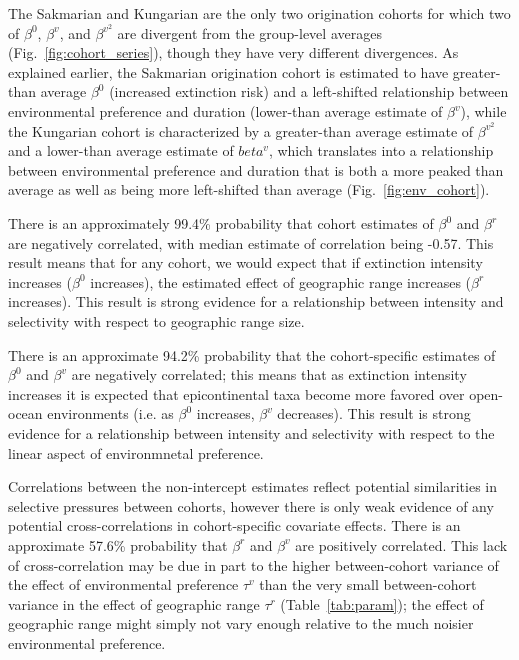 \documentclass[11pt]{article}
\begin{document}
The Sakmarian and Kungarian are the only two origination cohorts for which two of \(\beta^{0}\), \(\beta^{v}\), and \(\beta^{v^{2}}\) are divergent from the group-level averages (Fig.~\ref{fig:cohort_series}), though they have very different divergences. As explained earlier, the Sakmarian origination cohort is estimated to have greater-than average \(\beta^{0}\) (increased extinction risk) and a left-shifted relationship between environmental preference and duration (lower-than average estimate of \(\beta^{v}\)), while the Kungarian cohort is characterized by a greater-than average estimate of \(\beta^{v^{2}}\) and a lower-than average estimate of \(beta^{v}\), which translates into a relationship between environmental preference and duration that is both a more peaked than average as well as being more left-shifted than average (Fig.~\ref{fig:env_cohort}).


There is an approximately 99.4\% probability that cohort estimates of \(\beta^{0}\) and \(\beta^{r}\) are negatively correlated, with median estimate of correlation being -0.57. This result means that for any cohort, we would expect that if extinction intensity increases (\(\beta^{0}\) increases), the estimated effect of geographic range increases (\(\beta^{r}\) increases). This result is strong evidence for a relationship between intensity and selectivity with respect to geographic range size.

There is an approximate 94.2\% probability that the cohort-specific estimates of \(\beta^{0}\) and \(\beta^{v}\) are negatively correlated; this means that as extinction intensity increases it is expected that epicontinental taxa become more favored over open-ocean environments (i.e. as \(\beta^{0}\) increases, \(\beta^{v}\) decreases). This result is strong evidence for a relationship between intensity and selectivity with respect to the linear aspect of environmnetal preference. 

Correlations between the non-intercept estimates reflect potential similarities in selective pressures between cohorts, however there is only weak evidence of any potential cross-correlations in cohort-specific covariate effects. There is an approximate 57.6\% probability that \(\beta^{r}\) and \(\beta^{v}\) are positively correlated. This lack of cross-correlation may be due in part to the higher between-cohort variance of the effect of environmental preference \(\tau^{v}\) than the very small between-cohort variance in the effect of geographic range \(\tau^{r}\) (Table~\ref{tab:param}); the effect of geographic range might simply not vary enough relative to the much noisier environmental preference. 
\end{document}
